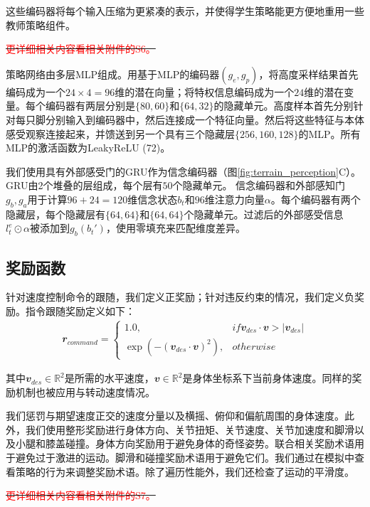   这些编码器将每个输入压缩为更紧凑的表示，并使得学生策略能更方便地重用一些教师策略组件。
  
  \sout{\textcolor{red}{\small 更详细相关内容看相关附件的S6。}}
  
  策略网络由多层MLP组成。用基于MLP的编码器$(g_e,g_p)$，将高度采样结果首先编码成为一个$24\times4=96$维的潜在向量；将特权信息编码成为一个$24$维的潜在变量。每个编码器有两层分别是$\{80,60\}$和$\{64,32\}$的隐藏单元。高度样本首先分别针对每只脚分别输入到编码器中，然后连接成一个特征向量。然后将这些特征与本体感受观察连接起来，并馈送到另一个具有三个隐藏层$\{256, 160, 128\}$的MLP。所有MLP的激活函数为LeakyReLU (72)。
  
  我们使用具有外部感受门的GRU作为信念编码器（图\ref{fig:terrain_perception}C）。GRU由2个堆叠的层组成，每个层有$50$个隐藏单元。
  信念编码器和外部感知门$g_b,g_a$用于计算$96 + 24 = 120$维信念状态$b_t$和$96$维注意力向量$\alpha$。每个编码器有两个隐藏层，每个隐藏层有$\{64, 64\}$和$\{64, 64\}$个隐藏单元。过滤后的外部感受信息$l_t^e\odot\alpha$被添加到$g_b(b_t')$，使用零填充来匹配维度差异。
  
  \subsection[奖励函数]{奖励函数}
  
  针对速度控制命令的跟随，我们定义正奖励；针对违反约束的情况，我们定义负奖励。指令跟随奖励定义如下：
  \begin{align}
    \mathbfit{r}_{command}=\begin{cases}
      1.0, &if \mathbfit{v}_{des}\cdot\mathbfit{v}>|\mathbfit{v}_{des}|\\
      \exp(-(\mathbfit{v}_{des}\cdot\mathbfit{v})^2), &otherwise
    \end{cases}
  \end{align}
  
  其中$\mathbfit{v}_{des}\in\mathbb{R}^2$是所需的水平速度，$\mathbfit{v}\in\mathbb{R}^2$是身体坐标系下当前身体速度。同样的奖励机制也被应用与转动速度情况。
  
  我们惩罚与期望速度正交的速度分量以及横摇、俯仰和偏航周围的身体速度。此外，我们使用整形奖励进行身体方向、关节扭矩、关节速度、关节加速度和脚滑以及小腿和膝盖碰撞。身体方向奖励用于避免身体的奇怪姿势。联合相关奖励术语用于避免过于激进的运动。脚滑和碰撞奖励术语用于避免它们。我们通过在模拟中查看策略的行为来调整奖励术语。除了遍历性能外，我们还检查了运动的平滑度。
  
  \sout{\textcolor{red}{\small 更详细相关内容看相关附件的S7。}}
  
